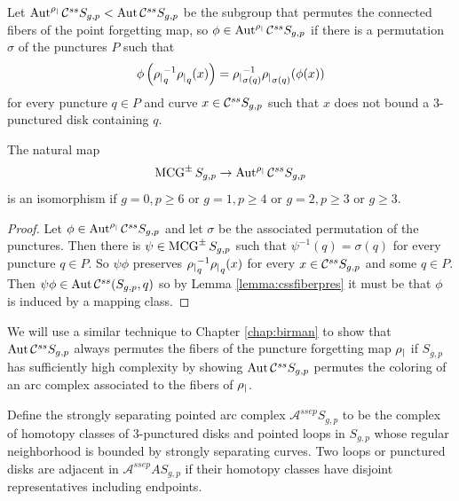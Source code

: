\begin{definition}
  Let $\operatorname{Aut}^{\rho_|}  \mathcal C^{{ss}}  S_{g,p} < \operatorname{Aut}  \mathcal C^{{ss}}  S_{g,p}$ be the subgroup that permutes the connected fibers of the point forgetting map, so
  $\phi \in \operatorname{Aut}^{\rho_|}  \mathcal C^{{ss}}  S_{g,p}$ if there is a permutation $\sigma$ of the punctures $P$ such that
  $$
   \phi \left( {\rho_|}_q^{-1}{\rho_|}_q(x) \right ) =  {\rho_|}_{\sigma(q)}^{-1}{\rho_|}_{\sigma(q)}( \phi(x))
  $$
  for every puncture $q \in P$ and curve $x \in  \mathcal C^{{ss}}  S_{g,p}$ such that $x$ does not bound a 3-punctured disk containing $q$.
\end{definition}

\begin{corollary}
  The natural map
  $$ \operatorname{MCG}^\pm S_{g,p} \to \operatorname{Aut}^{\rho_|}  \mathcal C^{{ss}}  S_{g,p}$$
  is an isomorphism if $g=0,p\geq6$ or $g=1,p\geq4$ or $g=2,p\geq3$ or $g\geq 3$.
  \label{cor:cssallfiberspres}
\end{corollary}

\begin{proof}
  Let $\phi \in \operatorname{Aut}^{\rho_|}  \mathcal C^{{ss}}  S_{g,p}$ and let $\sigma$ be the associated permutation of the punctures.
  Then there is $\psi \in \operatorname{MCG}^\pm S_{g,p}$ such that $\psi^{-1}(q) = \sigma(q)$ for every puncture $q \in P$.
  So $\psi \phi$ preserves ${\rho_|}_q^{-1}{\rho_|}_q(x)$ for  every $x \in  \mathcal C^{{ss}}  S_{g,p}$ and some $q \in P$.
  Then $\psi \phi \in \operatorname{Aut}  \mathcal C^{{ss}}   (S_{g,p},q)$ so by Lemma \ref{lemma:cssfiberpres}
  it must be that $\phi$ is induced by a mapping class.
\end{proof}

\begin{remark}
  We will use a similar technique to Chapter \ref{chap:birman} to show that $\operatorname{Aut}  \mathcal C^{{ss}}  S_{g,p}$
  always permutes the fibers of the puncture forgetting map ${\rho_|}$ if $S_{g,p}$ has sufficiently high complexity by
  showing $\operatorname{Aut}  \mathcal C^{{ss}}  S_{g,p}$ permutes the coloring of an arc complex associated to the fibers of ${\rho_|}$.
\end{remark}

\begin{definition}
  Define the strongly separating pointed arc complex
  $\mathcal A^{ssep} S_{g,p}$
  to be the complex of homotopy classes of 3-punctured disks
  and pointed loops
  in $S_{g,p}$ whose regular neighborhood
  is bounded by strongly separating curves.
  Two loops or punctured disks are adjacent in
  $\mathcal A^{ssep} A S_{g,p}$ if their homotopy classes
  have disjoint representatives including endpoints.
  \label{def:strongptarc}
\end{definition}

